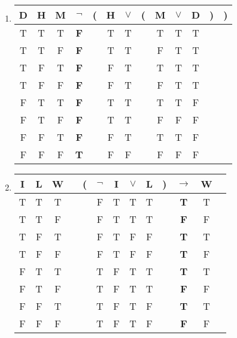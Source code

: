 \begin{enumerate}
	\item
	      \begin{tabular}{@{ }c@{ }@{ }c@{ }@{ }c | c@{ }@{}c@{}@{ }c@{ }@{ }c@{ }@{}c@{}@{ }c@{ }@{ }c@{ }@{ }c@{ }@{}c@{}@{}c@{ }}
		      D & H & M & $\lnot$    & ( & H & $\lor$ & ( & M & $\lor$ & D & ) & ) \\
		      \hline
		      T & T & T & \textbf{F} &   & T & T      &   & T & T      & T &   &   \\
		      T & T & F & \textbf{F} &   & T & T      &   & F & T      & T &   &   \\
		      T & F & T & \textbf{F} &   & F & T      &   & T & T      & T &   &   \\
		      T & F & F & \textbf{F} &   & F & T      &   & F & T      & T &   &   \\
		      F & T & T & \textbf{F} &   & T & T      &   & T & T      & F &   &   \\
		      F & T & F & \textbf{F} &   & T & T      &   & F & F      & F &   &   \\
		      F & F & T & \textbf{F} &   & F & T      &   & T & T      & F &   &   \\
		      F & F & F & \textbf{T} &   & F & F      &   & F & F      & F &   &   \\
	      \end{tabular}

	\item
	      \begin{tabular}{@{ }c@{ }@{ }c@{ }@{ }c | c@{ }@{}c@{}@{ }c@{ }@{ }c@{ }@{ }c@{ }@{ }c@{ }@{}c@{}@{ }c@{ }@{ }c@{ }@{ }c}
		      I & L & W &  & ( & $\lnot$ & I & $\lor$ & L & ) & $\rightarrow$ & W & \\
		      \hline
		      T & T & T &  &   & F       & T & T      & T &   & \textbf{T}    & T & \\
		      T & T & F &  &   & F       & T & T      & T &   & \textbf{F}    & F & \\
		      T & F & T &  &   & F       & T & F      & F &   & \textbf{T}    & T & \\
		      T & F & F &  &   & F       & T & F      & F &   & \textbf{T}    & F & \\
		      F & T & T &  &   & T       & F & T      & T &   & \textbf{T}    & T & \\
		      F & T & F &  &   & T       & F & T      & T &   & \textbf{F}    & F & \\
		      F & F & T &  &   & T       & F & T      & F &   & \textbf{T}    & T & \\
		      F & F & F &  &   & T       & F & T      & F &   & \textbf{F}    & F & \\
	      \end{tabular}


\end{enumerate}
